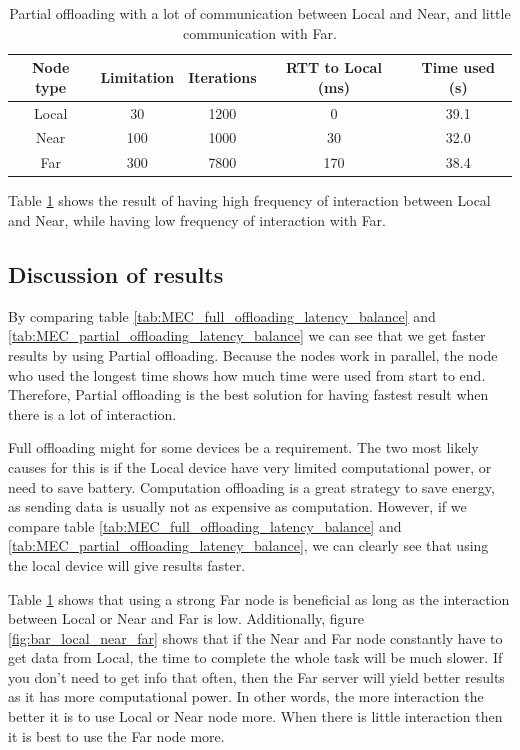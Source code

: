 \begin{table}[h!]
    \centering
    \begin{tabular}[c]{|c|c|c|c|c|}
        \hline
        Node type & Limitation & Iterations & RTT to Local (ms)& Time used (s)\\
        \hline
        \hline
        Local & 30 & 1200 & 0 & 39.1  \\
        \hline
        Near & 100 & 1000 & 30 & 32.0 \\
        \hline
        Far & 300 & 7800 & 170 & 38.4 \\
        \hline
    \end{tabular}
    \caption{Partial offloading with a lot of communication between Local and Near, and little communication with Far.}
    \label{tab:MEC_partial_offloading_little}
\end{table}

Table \ref{tab:MEC_partial_offloading_little} shows the result of having high frequency of interaction between Local and Near, while having low frequency of interaction with Far.



\subsection{Discussion of results} \label{subsection:MEC_comparison}%
By comparing table \ref{tab:MEC_full_offloading_latency_balance} and \ref{tab:MEC_partial_offloading_latency_balance} we can see that we get faster results by using Partial offloading. Because the nodes work in parallel, the node who used the longest time shows how much time were used from start to end. Therefore, Partial offloading is the best solution for having fastest result when there is a lot of interaction.


Full offloading might for some devices be a requirement. The two most likely causes for this is if the Local device have very limited computational power, or need to save battery. Computation offloading is a great strategy to save energy, as sending data is usually not as expensive as computation. However, if we compare table \ref{tab:MEC_full_offloading_latency_balance} and \ref{tab:MEC_partial_offloading_latency_balance}, we can clearly see that using the local device will give results faster.

Table \ref{tab:MEC_partial_offloading_little} shows that using a strong Far node is beneficial as long as the interaction between Local or Near and Far is low. Additionally, figure \ref{fig:bar_local_near_far} shows that if the Near and Far node constantly have to get data from Local, the time to complete the whole task will be much slower. If you don't need to get info that often, then the Far server will yield better results as it has more computational power. In other words, the more interaction the better it is to use Local or Near node more. When there is little interaction then it is best to use the Far node more.

